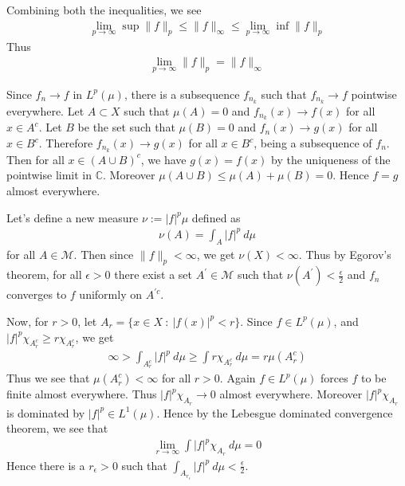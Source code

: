 \documentclass[12pt]{exam}
\theoremstyle{plain} %
\theoremstyle{definition} %
\theoremstyle{remark} %
\begin{document}
\begin{questions}
\begin{solution}
\begin{parts}
      Combining both the inequalities, we see
      \begin{align*}
        \lim_{p \to \infty} \sup \|f\|_p \le \|f\|_\infty \le \lim_{p
        \to \infty} \inf \|f\|_p
      \end{align*}
      Thus
      \begin{align*}
        \lim_{p \to \infty} \|f\|_p = \|f\|_\infty
      \end{align*}
    \end{parts}
  \end{solution}

  \question
  \begin{solution}
    Since $f_n \to f$ in $L^p(\mu)$, there is a subsequence $f_{n_k}$
    such that $f_{n_k} \to f$ pointwise everywhere. Let $A \subset X$
    such that $\mu(A) = 0$ and $f_{n_k}(x) \to f(x)$ for all $x \in A^c$.
    Let $B$ be the set such that $\mu(B) = 0$ and $f_n(x) \to g(x)$
    for all $x \in B^c$. Therefore $f_{n_k}(x) \to g(x)$ for all $x
    \in B^c$, being a subsequence of $f_n$. Then for all $x \in
    (A\cup B)^c$, we have $g(x) = f(x)$ by the uniqueness of the
    pointwise limit in $\mathbb{C}$. Moreover $\mu(A \cup B) \le
    \mu(A) + \mu(B) = 0$. Hence $f = g$ almost everywhere.
  \end{solution}

  \question
  \begin{solution}
    Let's define a new measure $\nu:= |f|^p \mu$ defined as
    \begin{align*}
      \nu(A) = \int_A |f|^p \ d \mu
    \end{align*}
    for all $A \in \mathcal{M}$. Then since $\|f\|_p < \infty$, we
    get $\nu(X) < \infty$. Thus by Egorov's theorem, for all
    $\epsilon>0$ there exist a
    set $A^\prime \in \mathcal{M}$ such that $\nu(A^\prime)<
    \frac{\epsilon}{2}$ and $f_n$ converges to $f$ uniformly on $A^{\prime c}$.

    Now, for $r > 0$, let $ A_r = \{ x \in X  \ : \  |f(x)|^p < r
    \}$. Since $f \in L^p(\mu)$, and $|f|^p \chi_{A_r^c} \ge r
    \chi_{A_r^c}$, we get
    \begin{align*}
      \infty > \int_{A_r^c} |f|^p \ d \mu \ge \int r \chi_{A^c_r} \ d
      \mu = r \mu(A_r^c)
    \end{align*}
    Thus we see that $\mu(A_r^c) < \infty$ for all $r > 0$. Again $ f
    \in L^p(\mu)$ forces $f$ to be finite almost everywhere. Thus
    $|f|^p \chi_{A_r} \to 0$ almost everywhere. Moreover $| f|^p
    \chi_{A_r}$ is dominated by $|f|^p \in L^1(\mu)$. Hence by the
    Lebesgue dominated convergence theorem, we see that
    \begin{align*}
      \lim_{r \to \infty} \int |f|^p \chi_{A_r} \ d \mu = 0
    \end{align*}
    Hence there is a $r_\epsilon >0$ such that $\int_{A_{r_\epsilon}}
    |f|^p \ d \mu < \frac{\epsilon}{2}$.


\end{solution}
\end{questions}
\end{document}
